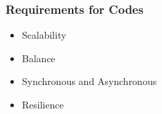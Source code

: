 \documentclass{beamer}
\begin{document}
	\begin{frame}\frametitle{Requirements for Codes}
		
		\begin{itemize}

			\item Scalability

			\item Balance

			\item Synchronous and Asynchronous

			\item Resilience
			
		\end{itemize}
		
	\end{frame}






	
	




\end{document}
